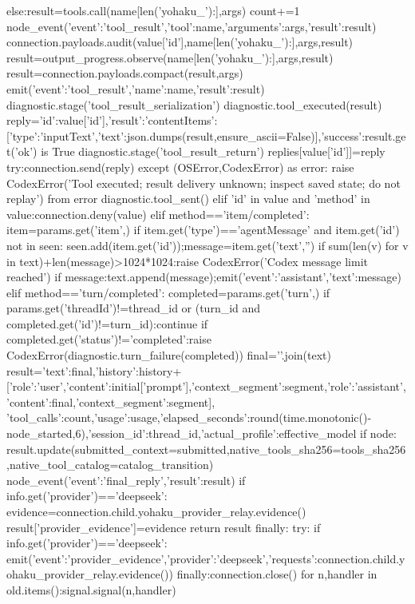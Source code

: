                     else:result=tools.call(name[len('yohaku_'):],args)
                    count+=1
                    node_event({'event':'tool_result','tool':name,'arguments':args,'result':result})
                    connection.payloads.audit(value['id'],name[len('yohaku_'):],args,result)
                    result=output_progress.observe(name[len('yohaku_'):],args,result)
                    result=connection.payloads.compact(result,args)
                    emit({'event':'tool_result','name':name,'result':result})
                diagnostic.stage('tool_result_serialization')
                diagnostic.tool_executed(result)
                reply={'id':value['id'],'result':{'contentItems':[{'type':'inputText','text':json.dumps(result,ensure_ascii=False)}],'success':result.get('ok') is True}}
                diagnostic.stage('tool_result_return')
                replies[value['id']]=reply
                try:connection.send(reply)
                except (OSError,CodexError) as error:
                    raise CodexError('Tool executed; result delivery unknown; inspect saved state; do not replay') from error
                diagnostic.tool_sent()
            elif 'id' in value and 'method' in value:connection.deny(value)
            elif method=='item/completed':
                item=params.get('item',{})
                if item.get('type')=='agentMessage' and item.get('id') not in seen:
                    seen.add(item.get('id'));message=item.get('text','')
                    if sum(len(v) for v in text)+len(message)>1024*1024:raise CodexError('Codex message limit reached')
                    if message:text.append(message);emit({'event':'assistant','text':message})
            elif method=='turn/completed':
                completed=params.get('turn',{})
                if params.get('threadId')!=thread_id or (turn_id and completed.get('id')!=turn_id):continue
                if completed.get('status')!='completed':raise CodexError(diagnostic.turn_failure(completed))
                final='\n'.join(text)
                result={'text':final,'history':history+[{'role':'user','content':initial['prompt'],'context_segment':segment},{'role':'assistant','content':final,'context_segment':segment}], 'tool_calls':count,'usage':usage,'elapsed_seconds':round(time.monotonic()-node_started,6),'session_id':thread_id,'actual_profile':effective_model}
                if node:
                    result.update(submitted_context=submitted,native_tools_sha256=tools_sha256,native_tool_catalog=catalog_transition)
                    node_event({'event':'final_reply','result':result})
                if info.get('provider')=='deepseek':
                    evidence=connection.child.yohaku_provider_relay.evidence()
                    result['provider_evidence']=evidence
                return result
    finally:
        try:
            if info.get('provider')=='deepseek':
                emit({'event':'provider_evidence','provider':'deepseek','requests':connection.child.yohaku_provider_relay.evidence()})
        finally:connection.close()
        for n,handler in old.items():signal.signal(n,handler)

